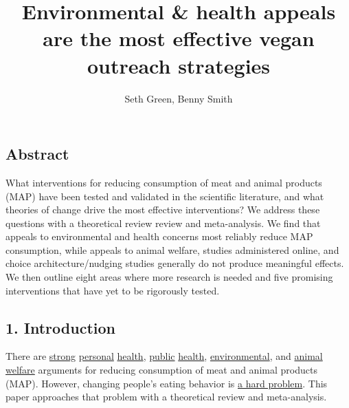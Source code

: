 \documentclass[
  letterpaper,
  DIV=11,
  numbers=noendperiod]{scrartcl}
\title{Environmental \& health appeals are the most effective vegan
outreach strategies}
\author{Seth Green, Benny Smith}
\date{}
\begin{document}
\maketitle
\ifdefined\Shaded\renewenvironment{Shaded}{\begin{tcolorbox}[boxrule=0pt, interior hidden, frame hidden, borderline west={3pt}{0pt}{shadecolor}, enhanced, sharp corners, breakable]}{\end{tcolorbox}}\fi

\hypertarget{abstract}{%
\subsection{Abstract}\label{abstract}}

What interventions for reducing consumption of meat and animal products
(MAP) have been tested and validated in the scientific literature, and
what theories of change drive the most effective interventions? We
address these questions with a theoretical review review and
meta-analysis. We find that appeals to environmental and health concerns
most reliably reduce MAP consumption, while appeals to animal welfare,
studies administered online, and choice architecture/nudging studies
generally do not produce meaningful effects. We then outline eight areas
where more research is needed and five promising interventions that have
yet to be rigorously tested.

\hypertarget{introduction}{%
\subsection{1. Introduction}\label{introduction}}

There are
\href{https://jamanetwork.com/journals/jamanetworkopen/fullarticle/2812392?resultClick=3}{strong}
\href{https://www.mayoclinic.org/healthy-lifestyle/nutrition-and-healthy-eating/in-depth/meatless-meals/art-20048193}{personal}
\href{https://europepmc.org/article/med/30209430}{health},
\href{https://pubmed.ncbi.nlm.nih.gov/20010001/}{public}
\href{https://www.theregreview.org/2022/10/12/khodor-how-factory-farming-could-cause-the-next-covid-19/}{health},
\href{https://www.theguardian.com/environment/2023/jul/20/vegan-diet-cuts-environmental-damage-climate-heating-emissions-study}{environmental},
and
\href{https://forum.effectivealtruism.org/topics/farmed-animal-welfare}{animal
welfare} arguments for reducing consumption of meat and animal products
(MAP). However, changing people's eating behavior is
\href{https://forum.effectivealtruism.org/posts/qgaKpgJfGgkZB3fjh/effectiveness-of-a-theory-informed-documentary-to-reduce}{a
hard problem}. This paper approaches that problem with a theoretical
review and meta-analysis.
\end{document}
